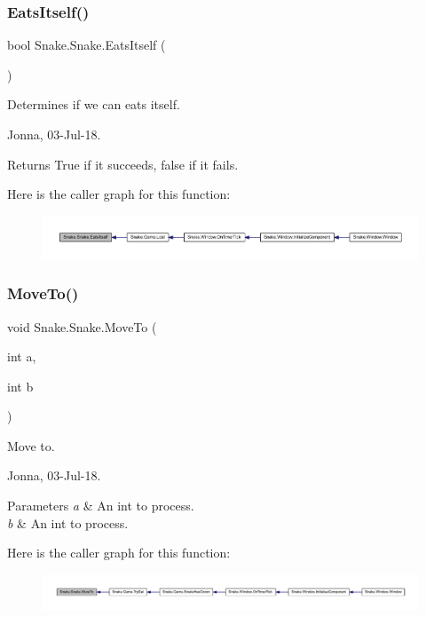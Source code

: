 \subsubsection{\texorpdfstring{Eats\+Itself()}{EatsItself()}}
{\footnotesize\ttfamily bool Snake.\+Snake.\+Eats\+Itself (\begin{DoxyParamCaption}{ }\end{DoxyParamCaption})}



Determines if we can eats itself. 

Jonna, 03-\/\+Jul-\/18. 

\begin{DoxyReturn}{Returns}
True if it succeeds, false if it fails. 
\end{DoxyReturn}
Here is the caller graph for this function\+:
\nopagebreak
\begin{figure}[H]
\begin{center}
\leavevmode
\includegraphics[width=350pt]{dd/d78/class_snake_1_1_snake_a1b5785fedc244882f02fa9145141c432_icgraph}
\end{center}
\end{figure}
\mbox{\label{class_snake_1_1_snake_a282122ce2c3e9e54a6aaca3f43ed1b44}} 
\subsubsection{\texorpdfstring{Move\+To()}{MoveTo()}}
{\footnotesize\ttfamily void Snake.\+Snake.\+Move\+To (\begin{DoxyParamCaption}\item[{int}]{a,  }\item[{int}]{b }\end{DoxyParamCaption})}



Move to. 

Jonna, 03-\/\+Jul-\/18. 


\begin{DoxyParams}{Parameters}
{\em a} & An int to process. \\
\hline
{\em b} & An int to process. \\
\hline
\end{DoxyParams}
Here is the caller graph for this function\+:
\nopagebreak
\begin{figure}[H]
\begin{center}
\leavevmode
\includegraphics[width=350pt]{dd/d78/class_snake_1_1_snake_a282122ce2c3e9e54a6aaca3f43ed1b44_icgraph}
\end{center}
\end{figure}


